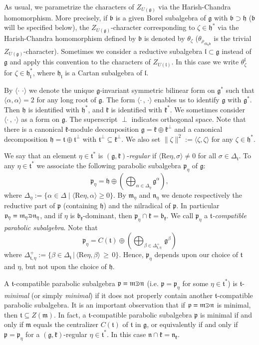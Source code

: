 \documentclass[default]{./styles/svmult}
\newcommand{\ch}{\mathrm{ch}}
\newcommand{\bb}{\mathfrak{b}}
\renewcommand{\gg}{\mathfrak{g}}
\newcommand{\hh}{\mathfrak{h}}
\newcommand{\kk}{\mathfrak{k}}
\renewcommand{\ll}{\mathfrak{l}}
\newcommand{\mm}{\mathfrak{m}}
\newcommand{\nn}{\mathfrak{n}}
\newcommand{\pp}{\mathfrak{p}}
\renewcommand{\tt}{\mathfrak{t}}
\def\crplus{\hbox{$\supset${\raise1.05pt\hbox{\kern -0.55em ${\scriptscriptstyle +}$}}\ }}
\begin{document}
As usual, we parametrize the characters of $Z_{U(\gg)}$ via the Harish-Chandra homomorphism. More precisely, if $\bb$ is a given Borel subalgebra of $\gg$ with $\bb\supset\hh$ ($\bb$ will be specified below), the $Z_{U(\gg)}$-character corresponding to $\zeta\in\hh^*$ via the Harish-Chandra homomorphism defined by $\bb$ is denoted by $\theta_\zeta$ ($\theta_{\rho_{\ch_\hh\bb}}$ is the trivial $Z_{U(\gg)}$-character). Sometimes we consider a reductive subalgebra $\ll \subset \gg$ instead of $\gg$ and apply this convention to the characters of $Z_{U(\ll)}$. In this case we write $\theta_{\zeta}^{\ll}$ for $\zeta \in \hh_{\ll}^*$, where $\hh_{\ll}$ is a Cartan subalgebra of $\ll$. 

By $\langle\cdot\,\,\cdot\rangle$ we denote the unique $\gg$-invariant symmetric bilinear form on $\gg^*$ such that $\langle\alpha,\alpha\rangle=2$ for any long root of $\gg$. The form $\langle\cdot\,,\,\cdot\rangle$ enables us to identify $\gg$ with $\gg^*$. Then $\hh$ is identified with $\hh^*$, and $\kk$ is identified with $\kk^*$. We sometimes consider $\langle\cdot\,,\,\cdot\rangle$ as a form on $\gg$. The superscript $\perp$ indicates orthogonal space. Note that there is a canonical $\kk$-module decomposition $\gg=\kk\oplus\kk^\perp$ and a canonical decomposition $\hh=\tt\oplus\tt^\perp$ with $\tt^\perp\subseteq\kk^\perp$. We also set $\parallel\zeta\parallel^2:=\langle\zeta,\zeta\rangle$ for any $\zeta\in\hh^*$.

We say that an element $\eta\in\tt^*$ is $(\gg,\kk)$-\textit{regular} if $\langle\mathrm{Re}\eta,\sigma\rangle\neq 0$ for all $\sigma\in\Delta_\tt$. To any $\eta\in\tt^*$ we associate the following parabolic subalgebra $\pp_\eta$ of $\gg$: $$\pp_\eta=\hh\oplus(\bigoplus_{\alpha\in\Delta_\eta}\gg^\alpha),$$ where $\Delta_\eta:=\{\alpha\in\Delta\; |\; \langle\mathrm{Re}\eta,\alpha\rangle\geq 0\}$. By $\mm_\eta$ and $\nn_\eta$ we denote respectively the reductive part of $\pp$ (containing $\hh$) and the nilradical of $\pp$. In particular $\pp_\eta=\mm_\eta\crplus\nn_\eta$, and if $\eta$ is $\bb_\kk$-dominant, then $\pp_\eta\cap\kk=\bb_\kk$. We call $\pp_\eta$ a \textit{$\tt$-compatible parabolic subalgebra}. Note that $$\pp_\eta = C(\tt)\oplus(\bigoplus_{\beta \in \Delta^+_{\tt,\eta}}\,\gg^\beta)$$ where $\Delta^+_{\tt,\eta} := \lbrace\beta\in\Delta_\tt\,|\,\langle \mathrm{Re}\eta,\beta\rangle\,\geq\,0\rbrace$. Hence, $\pp_\eta$ depends upon our choice of $\tt$ and $\eta$, but not upon the choice of $\hh$.  

A $\tt$-compatible parabolic subalgebra $\pp=\mm\crplus\nn$ (i.e. $\pp=\pp_\eta$ for some $\eta\in\tt^*$) is $\tt$-\textit{minimal} (or simply \textit{minimal}) if it does not properly contain another $\tt$-compatible parabolic subalgebra. It is an important observation that if $\pp=\mm\crplus\nn$ is minimal, then $\tt\subseteq Z(\mm)$. In fact, a $\tt$-compatible parabolic subalgebra $\pp$ is minimal if and only if $\mm$ equals the centralizer $C(\tt)$ of $\tt$ in $\gg$, or equivalently if and only if $\pp=\pp_\eta$ for a $(\gg,\kk)$-regular $\eta \in \tt^*$. In this case $\nn\cap\kk =\nn_\kk$.
\end{document}
